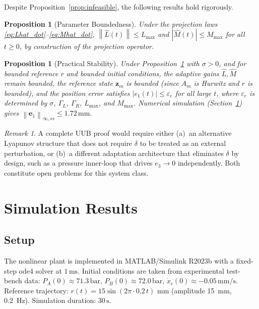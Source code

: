 \documentclass[12pt,a4paper]{article}
\theoremstyle{plain}
\newtheorem{proposition}[theorem]{Proposition}
\theoremstyle{definition}
\theoremstyle{remark}
\newtheorem{remark}[theorem]{Remark}
\newcommand{\norm}[1]{\left\|#1\right\|}
\newcommand{\abs}[1]{\left|#1\right|}
\newcommand{\Am}{A_m}           %
\newcommand{\Lh}{\hat{L}}       %
\newcommand{\Mh}{\hat{M}}       %
\newcommand{\dlt}{\delta}       %
\newcommand{\GL}{\Gamma_L}
\newcommand{\GR}{\Gamma_R}
\newcommand{\e}{\mathbf{e}}     %
\newcommand{\zm}{\mathbf{z}_m}  %
\begin{document}
Despite Proposition~\ref{prop:infeasible}, the following results hold
rigorously.

\begin{proposition}[Parameter Boundedness]
\label{prop:bounded}
Under the projection laws \eqref{eq:Lhat_dot}--\eqref{eq:Mhat_dot},
$\norm{\Lh(t)}\le L_{\max}$ and $\abs{\Mh(t)}\le M_{\max}$ for all
$t\ge 0$, by construction of the projection operator.
\end{proposition}

\begin{proposition}[Practical Stability]
\label{prop:practical}
Under Proposition~\ref{prop:bounded} with $\sigma>0$, and for bounded
reference $r$ and bounded initial conditions, the adaptive gains
$\Lh,\Mh$ remain bounded, the reference state $\zm$ is bounded
(since $\Am$ is Hurwitz and $r$ is bounded), and the position error
satisfies $\abs{e_1(t)}\le\varepsilon_e$ for all large $t$, where
$\varepsilon_e$ is determined by $\sigma$, $\GL$, $\GR$, $L_{\max}$,
and $M_{\max}$.  Numerical simulation (Section~\ref{sec:sim}) gives
$\norm{\e_1}_{\infty,ss} \le 1.72\,\mathrm{mm}$.
\end{proposition}

\begin{remark}
A complete UUB proof would require either (a)~an alternative Lyapunov
structure that does not require $\dlt$ to be treated as an external
perturbation, or (b)~a different adaptation architecture that
eliminates $\dlt$ by design, such as a pressure inner-loop that drives
$e_3\to 0$ independently.  Both constitute open problems for this
system class.
\end{remark}

\section{Simulation Results}
\label{sec:sim}

\subsection{Setup}

The nonlinear plant is implemented in MATLAB/Simulink R2023b with a
fixed-step ode4 solver at $1\,\mathrm{ms}$.  Initial conditions are
taken from experimental test-bench data:
$P_A(0)\approx71.3\,\mathrm{bar}$, $P_B(0)\approx72.0\,\mathrm{bar}$,
$\dot x_c(0)\approx-0.05\,\mathrm{mm/s}$.  Reference trajectory:
$r(t) = 15\sin(2\pi\cdot 0.2\,t)$ mm (amplitude 15~mm, 0.2~Hz).
Simulation duration: $30\,\mathrm{s}$.
\end{document}
